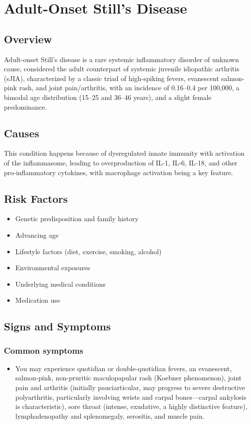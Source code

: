 \chapter{Adult-Onset Still's Disease}
\label{sec:Adult-Onset Still's Disease (AOSD)}

\section{Overview}
Adult-onset Still's disease is a rare systemic inflammatory disorder of unknown cause, considered the adult counterpart of systemic juvenile idiopathic arthritis (sJIA), characterized by a classic triad of high-spiking fevers, evanescent salmon-pink rash, and joint pain/arthritis, with an incidence of 0.16--0.4 per 100,000, a bimodal age distribution (15--25 and 36--46 years), and a slight female predominance.
\section{Causes}
This condition happens because of dysregulated innate immunity with activation of the inflammasome, leading to overproduction of IL-1, IL-6, IL-18, and other pro-inflammatory cytokines, with macrophage activation being a key feature.     
\section{Risk Factors}

\begin{itemize}[noitemsep]
  \item Genetic predisposition and family history
  \item Advancing age
  \item Lifestyle factors (diet, exercise, smoking, alcohol)
  \item Environmental exposures
  \item Underlying medical conditions
  \item Medication use
\end{itemize}
\section{Signs and Symptoms}

\subsection{Common symptoms}
\begin{itemize}[noitemsep]
  \item You may experience quotidian or double-quotidian fevers, an evanescent, salmon-pink, non-pruritic maculopapular rash (Koebner phenomenon), joint pain and arthritis (initially pauciarticular, may progress to severe destructive polyarthritis, particularly involving wrists and carpal bones---carpal ankylosis is characteristic), sore throat (intense, exudative, a highly distinctive feature), lymphadenopathy and splenomegaly, serositis, and muscle pain. 
  \end{itemize}

